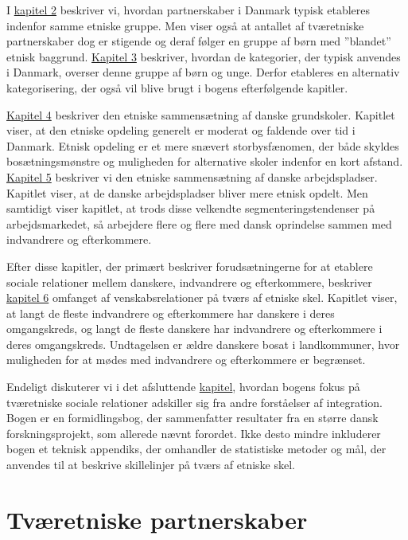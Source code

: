 \documentclass[
]{book}
\begin{document}
I \hyperref[kap2]{kapitel 2} beskriver vi, hvordan partnerskaber i Danmark typisk etableres indenfor samme etniske gruppe. Men viser også at antallet af tværetniske partnerskaber dog er stigende og deraf følger en gruppe af børn med ''blandet'' etnisk baggrund. \hyperref[kap3]{Kapitel 3} beskriver, hvordan de kategorier, der typisk anvendes i Danmark, overser denne gruppe af børn og unge. Derfor etableres en alternativ kategorisering, der også vil blive brugt i bogens efterfølgende kapitler.

\hyperref[kap4]{Kapitel 4} beskriver den etniske sammensætning af danske grundskoler. Kapitlet viser, at den etniske opdeling generelt er moderat og faldende over tid i Danmark. Etnisk opdeling er et mere snævert storbysfænomen, der både skyldes bosætningsmønstre og muligheden for alternative skoler indenfor en kort afstand. \hyperref[kap5]{Kapitel 5} beskriver vi den etniske sammensætning af danske arbejdspladser. Kapitlet viser, at de danske arbejdspladser bliver mere etnisk opdelt. Men samtidigt viser kapitlet, at trods disse velkendte segmenteringstendenser på arbejdsmarkedet, så arbejdere flere og flere med dansk oprindelse sammen med indvandrere og efterkommere.

Efter disse kapitler, der primært beskriver forudsætningerne for at etablere sociale relationer mellem danskere, indvandrere og efterkommere, beskriver \hyperref[kap6]{kapitel 6} omfanget af venskabsrelationer på tværs af etniske skel. Kapitlet viser, at langt de fleste indvandrere og efterkommere har danskere i deres omgangskreds, og langt de fleste danskere har indvandrere og efterkommere i deres omgangskreds. Undtagelsen er ældre danskere bosat i landkommuner, hvor muligheden for at mødes med indvandrere og efterkommere er begrænset.

Endeligt diskuterer vi i det afsluttende \hyperref[kap7]{kapitel}, hvordan bogens fokus på tværetniske sociale relationer adskiller sig fra andre forståelser af integration. Bogen er en formidlingsbog, der sammenfatter resultater fra en større dansk forskningsprojekt, som allerede nævnt forordet. Ikke desto mindre inkluderer bogen et teknisk appendiks, der omhandler de statistiske metoder og mål, der anvendes til at beskrive skillelinjer på tværs af etniske skel.

\chapter{Tværetniske partnerskaber}\label{kap2}

\thispagestyle{empty}
\end{document}
